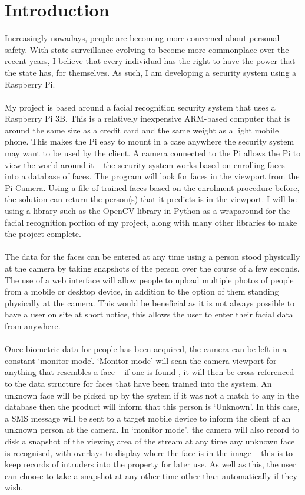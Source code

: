 \documentclass[9pt]{article}
\begin{document}
\section{Introduction}\label{sec_introduction}
Increasingly nowadays, people are becoming more concerned about personal safety. With state-surveillance evolving to become more commonplace over the recent years, I believe that every individual has the right to have the power that the state has, for themselves. As such, I am developing a security system using a Raspberry Pi.\\\\
My project is based around a facial recognition security system that uses a Raspberry Pi 3B. This is a relatively inexpensive ARM-based computer that is around the same size as a credit card and the same weight as a light mobile phone. This makes the Pi easy to mount in a case anywhere the security system may want to be used by the client. A camera connected to the Pi allows the Pi to view the world around it -- the security system works based on enrolling faces into a database of faces. The program will look for faces in the viewport from the Pi Camera. Using a file of trained faces based on the enrolment procedure before, the solution can return the person(s) that it predicts is in the viewport. I will be using a library such as the OpenCV library in Python as a wraparound for the facial recognition portion of my project, along with many other libraries to make the project complete.\\\\
The data for the faces can be entered at any time using a person stood physically at the camera by taking snapshots of the person over the course of a few seconds. The use of a web interface will allow people to upload multiple photos of people from a mobile or desktop device, in addition to the option of them standing physically at the camera. This would be beneficial as it is not always possible to have a user on site at short notice, this allows the user to enter their facial data from anywhere.\\\\
Once biometric data for people has been acquired, the camera can be left in a constant `monitor mode’. `Monitor mode’ will scan the camera viewport for anything that resembles a face – if one is found , it will then be cross referenced to the data structure for faces that have been trained into the system. An unknown face will be picked up by the system if it was not a match to any in the database then the product will inform that this person is `Unknown'. In this case, a SMS message will be sent to a target mobile device to inform the client of an unknown person at the camera. In ‘monitor mode’, the camera will also record to disk a snapshot of the viewing area of the stream at any time any unknown face is recognised, with overlays to display where the face is in the image – this is to keep records of intruders into the property for later use. As well as this, the user can choose to take a snapshot at any other time other than automatically if they wish.\\\\
\end{document}
